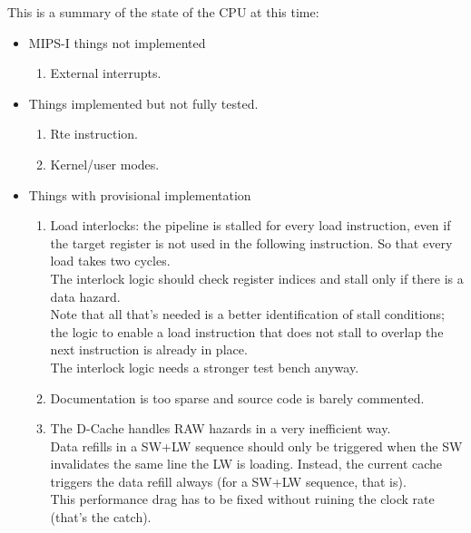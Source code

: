 \documentclass[11pt]{article}
\begin{document}
    This is a summary of the state of the CPU at this time:
\begin{itemize}
    \item MIPS-I things not implemented
    \begin{enumerate}
        \item External interrupts.
    \end{enumerate}

    \item Things implemented but not fully tested.
    \begin{enumerate}
        \item Rte instruction.
        \item Kernel/user modes.
    \end{enumerate}

    \item Things with provisional implementation
    \begin{enumerate}
        \item Load interlocks: the pipeline is stalled for every load instruction,
            even if the target register is not used in the following
            instruction. So that every load takes two cycles.\\
            The interlock logic should check register indices and stall only if
            there is a data hazard.\\
            Note that all that's needed is a better identification of stall
            conditions; the logic to enable a load instruction that does not
            stall to overlap the next instruction is already in place.\\
            The interlock logic needs a stronger test bench anyway.
        \item Documentation is too sparse and source code is barely commented.\\
        \item The D-Cache handles RAW hazards in a very inefficient way.\\
            Data refills in a SW+LW sequence should only be triggered when the
            SW invalidates the same line the LW is loading. Instead, the current
            cache triggers the data refill always (for a SW+LW sequence, that 
            is).\\
            This performance drag has to be fixed without ruining the clock rate
            (that's the catch).
    \end{enumerate}
\end{itemize}
\end{document}
